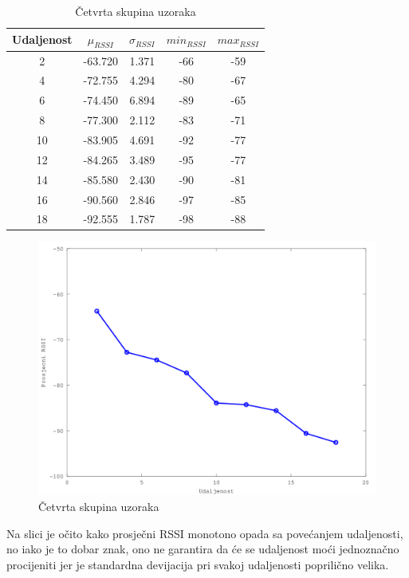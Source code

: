 \begin{table}[H]
    \centering
    \caption{Četvrta skupina uzoraka}
    \label{tbl:velikaUdaljenost}
    \begin{tabular}{ccccc}
    \hline 
    Udaljenost & $\mu_{RSSI}$ & $\sigma_{RSSI}$ & $min_{RSSI}$ & $max_{RSSI}$ \\ 
    \hline 
    2 & -63.720 & 1.371 & -66 & -59 \\ 
    4 & -72.755 & 4.294 & -80 & -67 \\ 
    6 & -74.450 & 6.894 & -89 & -65 \\ 
    8 & -77.300 & 2.112 & -83 & -71 \\ 
    10 & -83.905 & 4.691 & -92 & -77 \\ 
    12 & -84.265 & 3.489 & -95 & -77 \\ 
    14 & -85.580 & 2.430 & -90 & -81 \\ 
    16 & -90.560 & 2.846 & -97 & -85 \\ 
    18 & -92.555 & 1.787 & -98 & -88 \\ 
    \hline 
    \end{tabular} 
\end{table}

\begin{figure}[H]
    \centering
    \includegraphics[scale=0.62]{pictures/cetvrta-skupina-uzoraka}
    \caption{Četvrta skupina uzoraka}
    \label{fig:velikaUdaljenost}
\end{figure}

Na slici je očito kako prosječni RSSI monotono opada sa povećanjem udaljenosti, no iako je to dobar znak, ono ne garantira da će se udaljenost moći jednoznačno procijeniti jer je standardna devijacija pri svakoj udaljenosti poprilično velika.

